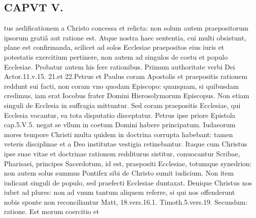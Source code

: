 \documentclass{article}
\begin{document}
\begin{pages}
\section*{CAPVT  V. }
\marginpar{[ p.245 ]}\pstart tus aedificationem a Christo concessa et relicta: non solum autem praepositorum ipsorum gratiâ aut ratione est. Atque nostra haec sententia, cui multi obsistunt, plane est confirmanda, scilicet ad solos Ecclesiae praepositos eius iuris et potestatis exercitium pertinere, non autem ad singulos de coetu et populo Ecclesiae. Probatur autem his fere rationibus. Primum authoritate verbi Dei Actor.11.v.15. 21.et 22.Petrus et Paulus coram Apostolis et praepositis rationem reddunt sui facti, non coram vno quodam Episcopo: quanquam, si quibusdam credimus, iam erat Iocobus frater Domini Hierosolymorum Episcopus. Non etiam singuli de Ecclesia in suffragia mittuntur. Sed coram praepositis Ecclesiae, qui Ecclesia vocantur, ea tota disputatio disceptatur. Petrus ipse priore Epistola cap.5.V.5. negat se vllum in coetum Domini habere principatum. Iudaeorum mores tempore Christi multa quidem in doctrina corrupta habebant: tamen veteris disciplinae et a Deo institutae vestigia retinebantur. Itaque cum Christus ipse suae vitae et doctrinae rationem redditurus sistitur, conuocantur Scribae, Pharisaei, principes Sacerdotum, id est, praepositi Ecclesiae, totumque synedrion: non autem solus summus Pontifex sibi de Christo sumit iudicium. Non item iudicant singuli de populo, sed praefecti Ecclesiae duntaxat. Denique Christus nos iubet ad plures: non ad vnum tantum aliquem referre, si qui nos offenderunt nobis sponte non reconciliantur Matt, 18.vers.16.1. Timoth.5.vers.19. Secundum: ratione. Est morum coercitio et  \pend

\end{pages}
\end{document}
